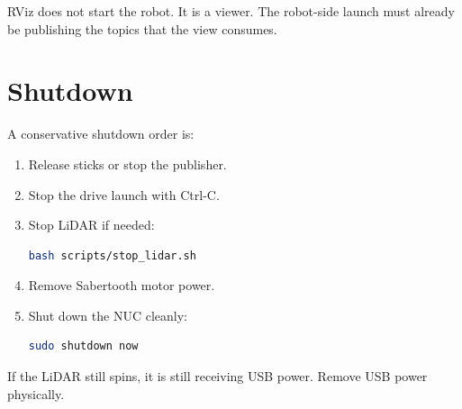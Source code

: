 RViz does not start the robot. It is a viewer. The robot-side launch must already be publishing the topics that the view consumes.

\section{Shutdown}

A conservative shutdown order is:

\begin{enumerate}
  \item Release sticks or stop the  publisher.
  \item Stop the drive launch with Ctrl-C.
  \item Stop LiDAR if needed:
\begin{lstlisting}[language=bash]
bash scripts/stop_lidar.sh
\end{lstlisting}
  \item Remove Sabertooth motor power.
  \item Shut down the NUC cleanly:
\begin{lstlisting}[language=bash]
sudo shutdown now
\end{lstlisting}
\end{enumerate}

If the LiDAR still spins, it is still receiving USB power. Remove USB power physically.
